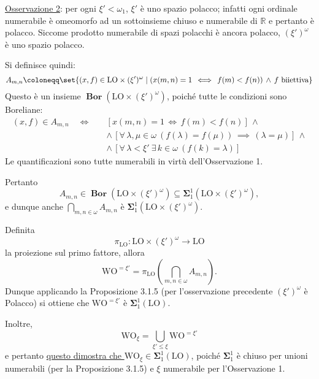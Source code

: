\documentclass{article}
\newcommand{\1}{\mathds{1}}
\newcommand{\R}{\mathds{R}}
\begin{document}
\begin{itemize}
\uline{Osservazione 2}: per ogni \(\xi'<\omega_{1}\), \(\xi'\) è uno spazio polacco; infatti ogni ordinale numerabile è omeomorfo ad un sottoinsieme chiuso e numerabile di \(\R\) e pertanto è polacco. Siccome prodotto numerabile di spazi polacchi è ancora polacco, \((\xi')^{\omega}\) è uno spazio polacco.

Si definisce quindi:
\begin{equation*}
  	A_{m,n} \coloneqq \set{(x, f) \in \mathrm{LO}\times (\xi')^{\omega }\mid \left(x(m,n)=1 \,\iff\, f(m)<f(n)\right) \,\land\, f\text{ biiettiva}}
\end{equation*}
Questo è un insieme \(\bm{{\operatorname{Bor}}}\left(\mathrm{LO}\times(\xi')^{\omega}\right)\), poiché tutte le condizioni sono Boreliane:
\begin{align*}
  	(x,f) \in A_{m,n}\quad \iff\quad &\left[x(m,n)=1 \,\iff\, f(m)<f(n)\right] \,\land\\
  	&\land\, \left[\forall\, \lambda,\mu \in \omega\ \left(f(\lambda)= f(\mu)\right) \,\implies\,(\lambda = \mu)\right] \,\land\\
  	&\land\, \left[\forall\,\lambda<\xi'\ \exists\, k \in \omega\ \left(f(k)=\lambda\right)\right]
\end{align*}
Le quantificazioni sono tutte numerabili in virtù dell'Osservazione 1.

Pertanto
\begin{equation*}
A_{m,n} \in \bm{{\operatorname{Bor}}}\left(\mathrm{LO}\times(\xi')^{\omega}\right) \subseteq \bm{\Sigma}_{1}^{1}\left(\mathrm{LO}\times(\xi')^{\omega}\right),
\end{equation*}
e dunque anche \(\bigcap_{m,n \in \omega} A_{m,n}\) è \(\bm{\Sigma}_{1}^{1}\left(\mathrm{LO}\times(\xi')^{\omega}\right)\).

Definita
\begin{equation*}
  	\pi_{\mathrm{LO}}: \mathrm{LO} \times (\xi')^{\omega} \to \mathrm{LO}
\end{equation*}
la proiezione sul primo fattore, allora
\begin{equation*}
  	\mathrm{WO}^{=\xi'} = \pi_{\mathrm{LO}}\left(\bigcap_{m,n \in \omega} A_{m,n}\right).
\end{equation*}
Dunque applicando la Proposizione 3.1.5 (per l'osservazione precedente \((\xi')^{\omega}\) è Polacco) si ottiene che \(\mathrm{WO}^{=\xi'}\) è \(\bm{\Sigma}_{1}^{1}(\mathrm{LO})\).

Inoltre,
\begin{equation*}
  	\mathrm{WO}_{\xi} = \bigcup_{\xi'\le \xi} \mathrm{WO}^{=\xi'}
\end{equation*}
e pertanto \uline{questo dimostra che \(\mathrm{WO}_{\xi} \in \bm{\Sigma}_{1}^{1}(\mathrm{LO})\)}, poiché \(\bm{\Sigma}_{1}^{1}\) è chiuso per unioni numerabili (per la Proposizione 3.1.5) e \(\xi\) numerabile per l'Osservazione 1.


\end{itemize}
\end{document}
